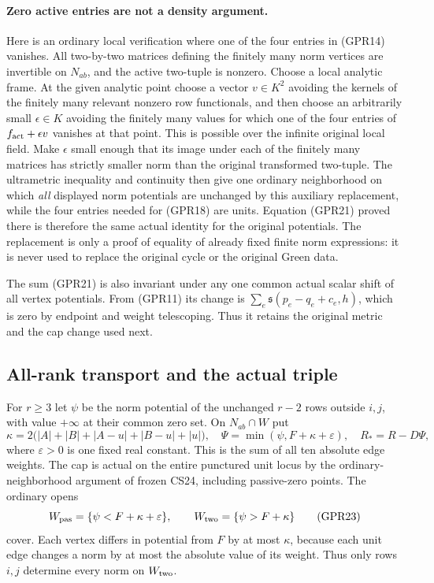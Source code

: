 \paragraph{Zero active entries are not a density argument.}
Here is an ordinary local verification where one of the four entries
in (GPR14) vanishes.  All two-by-two matrices defining the finitely
many norm vertices are invertible on $N_{ab}$, and the active
two-tuple is nonzero.  Choose a local analytic frame.  At the given
analytic point choose a vector $v\in K^2$ avoiding the kernels of
the finitely many relevant nonzero row functionals, and then choose
an arbitrarily small $\epsilon\in K$ avoiding the finitely many
values for which one of the four entries of
$f_{\rm act}+\epsilon v$ vanishes at that point.  This is possible
over the infinite original local field.  Make $\epsilon$ small
enough that its image under each of the finitely many matrices has
strictly smaller norm than the original transformed two-tuple.
The ultrametric inequality and continuity then give one ordinary
neighborhood on which \emph{all} displayed norm potentials are
unchanged by this auxiliary replacement, while the four entries
needed for (GPR18) are units.  Equation (GPR21) proved there is
therefore the same actual identity for the original potentials.
The replacement is only a proof of equality of already fixed
finite norm expressions: it is never used to replace the original
cycle or the original Green data.

The sum (GPR21) is also invariant under any one common actual
scalar shift of all vertex potentials.  From (GPR11) its change
is $\sum_e\mathfrak s(p_e-q_e+c_e,h)$, which is zero by
endpoint and weight telescoping.  Thus it retains the original
metric and the cap change used next.

\subsection{All-rank transport and the actual triple}

For $r\ge3$ let $\psi$ be the norm potential of the unchanged
$r-2$ rows outside $i,j$, with value $+\infty$ at their common
zero set.  On $N_{ab}\cap W$ put
\[
 \kappa=2\bigl(|A|+|B|+|A-u|+|B-u|+|u|\bigr),
 \quad\Psi=\min(\psi,F+\kappa+\varepsilon),\quad
 R_*=R-D\Psi,
 \tag{GPR22}
\]
where $\varepsilon>0$ is one fixed real constant.  This is the
sum of all ten absolute edge weights.  The cap is actual on the
entire punctured unit locus by the ordinary-neighborhood argument
of frozen CS24, including passive-zero points.  The ordinary opens
\[
 W_{\rm pas}=\{\psi<F+\kappa+\varepsilon\},\qquad
 W_{\rm two}=\{\psi>F+\kappa\}
 \tag{GPR23}
\]
cover.  Each vertex differs in potential from $F$ by at most
$\kappa$, because each unit edge changes a norm by at most the
absolute value of its weight.  Thus only rows $i,j$ determine
every norm on $W_{\rm two}$.

